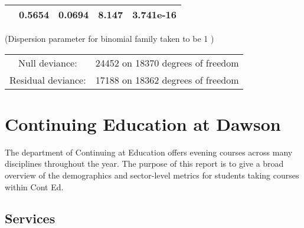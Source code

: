 \documentclass[]{book}
\theoremstyle{definition}
\theoremstyle{definition}
\theoremstyle{remark}
\begin{document}
\begin{longtable}[]{@{}ccccc@{}}
\begin{minipage}[t]{0.30\columnwidth}
\end{minipage} & \begin{minipage}[t]{0.13\columnwidth}\centering\strut
0.5654\strut
\end{minipage} & \begin{minipage}[t]{0.16\columnwidth}\centering\strut
0.0694\strut
\end{minipage} & \begin{minipage}[t]{0.12\columnwidth}\centering\strut
8.147\strut
\end{minipage} & \begin{minipage}[t]{0.12\columnwidth}\centering\strut
3.741e-16\strut
\end{minipage}\tabularnewline
\bottomrule
\end{longtable}

(Dispersion parameter for binomial family taken to be 1 )

\begin{longtable}[]{@{}cl@{}}
\toprule
\begin{minipage}[t]{0.25\columnwidth}\centering\strut
Null deviance:\strut
\end{minipage} & \begin{minipage}[t]{0.35\columnwidth}\raggedright\strut
24452 on 18370 degrees of freedom\strut
\end{minipage}\tabularnewline
\begin{minipage}[t]{0.25\columnwidth}\centering\strut
Residual deviance:\strut
\end{minipage} & \begin{minipage}[t]{0.35\columnwidth}\raggedright\strut
17188 on 18362 degrees of freedom\strut
\end{minipage}\tabularnewline
\bottomrule
\end{longtable}

\chapter{Continuing Education at
Dawson}\label{continuing-education-at-dawson}

The department of Continuing at Education offers evening courses across
many disciplines throughout the year. The purpose of this report is to
give a broad overview of the demographics and sector-level metrics for
students taking courses within Cont Ed.

\section{Services}\label{services}
\end{document}
